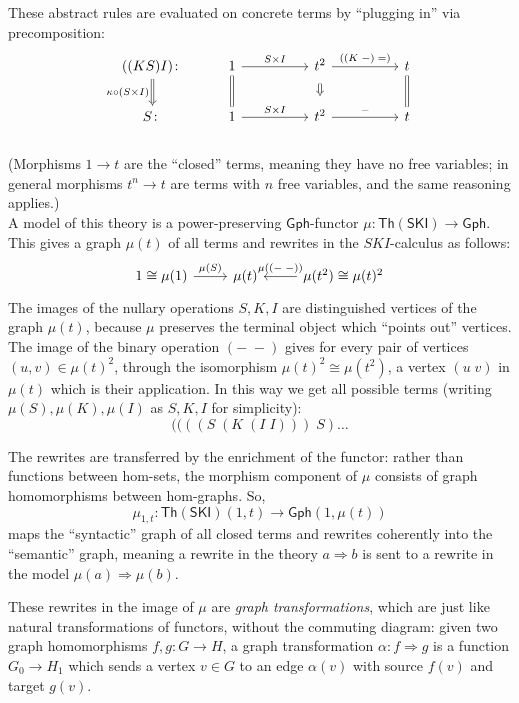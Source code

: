 \documentclass{amsart}
\theoremstyle{definition}
\newcommand{\Th}{\mathsf{Th}}
\newcommand{\Gph}{\mathsf{Gph}}
\newcommand{\maps}{\colon}
\begin{document}
These abstract rules are evaluated on concrete terms by ``plugging in'' via precomposition:
\[\begin{tikzcd}
	((KS)I)\maps \arrow[Rightarrow,d,swap,"\kappa \circ (S\times I)"] & 1 \arrow[d,equal] \arrow[rr,"S\times I"] && t^2 \arrow[Rightarrow,d,shorten >=0.2cm,shorten <=0.2cm] \arrow[rr,"((K\; -)\; =)"] && t \arrow[d,equal]\\
	S\maps & 1 \arrow[rr,"S\times I"] && t^2 \arrow[rr,"-"] && t
\end{tikzcd}\]\\
(Morphisms $1\to t$ are the ``closed'' terms, meaning they have no free variables; in general morphisms $t^n\to t$ are terms with $n$ free variables, and the same reasoning applies.)\\

A model of this theory is a power-preserving $\Gph$-functor $\mu\maps \Th(\mathsf{SKI}) \to \Gph$. This gives a graph $\mu(t)$ of all terms and rewrites in the $SKI$-calculus as follows:
\[\begin{tikzcd}
1 \cong \mu(1) \arrow[r,"\mu(S)"] & \mu(t) & \mu(t^2) \arrow[l,swap,"\mu(\left(-\;-\right))"] \cong \mu(t)^2
\end{tikzcd}\]
The images of the nullary operations $S,K,I$ are distinguished vertices of the graph $\mu(t)$, because $\mu$ preserves the terminal object which ``points out'' vertices. The image of the binary operation $(-\; -)$ gives for every pair of vertices $(u,v) \in \mu(t)^2$, through the isomorphism $\mu(t)^2 \cong \mu(t^2)$, a vertex $(u\; v)$ in $\mu(t)$ which is their application. In this way we get all possible terms (writing $\mu(S),\mu(K),\mu(I)$ as $S,K,I$ for simplicity): 
\[  ((((S\; (K\; (I\; I)))\; S) \dots \]

The rewrites are transferred by the enrichment of the functor: rather than functions between hom-sets, the morphism component of $\mu$ consists of graph homomorphisms between hom-graphs. So, $$\mu_{1,t}\maps \Th(\mathsf{SKI})(1,t)\to \Gph(1,\mu(t))$$ maps the ``syntactic'' graph of all closed terms and rewrites coherently into the ``semantic'' graph, meaning a rewrite in the theory $a\Rightarrow b$ is sent to a rewrite in the model $\mu(a) \Rightarrow \mu(b)$.

These rewrites in the image of $\mu$ are \textit{graph transformations}, which are just like natural transformations of functors, without the commuting diagram: given two graph homomorphisms $f,g\maps G\to H$, a graph transformation $\alpha\maps f \Rightarrow g$ is a function $G_0\to H_1$ which sends a vertex $v\in G$ to an edge $\alpha(v)$ with source $f(v)$ and target $g(v)$.
\end{document}
